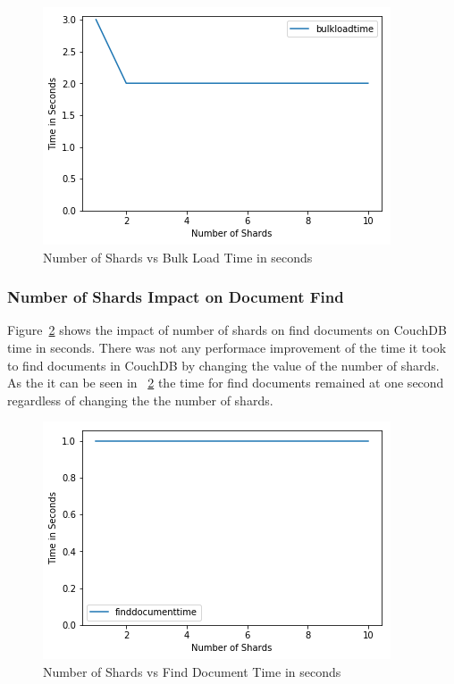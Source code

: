 \begin{figure}[!ht]
  \centering\includegraphics[width=\columnwidth]{../images/ShardsBulkLoad.png}
  \caption{Number of Shards vs Bulk Load Time in seconds }\label{f:shard-bulk}
\end{figure}



\subsubsection{Number of Shards Impact on Document Find}


Figure~\ref{f:shard-find} shows the impact of number of shards on find
documents on CouchDB time in seconds. There was not any performace
improvement of the time it took to find documents in CouchDB  by
changing the value of the number of shards. As the it can be seen in
~\ref{f:shard-find} the time for find documents remained at one second
regardless of changing the the number of shards.

\begin{figure}[!ht]
  \centering\includegraphics[width=\columnwidth]{../images/ShardsFindDoc.png}
  \caption{Number of Shards vs Find Document Time in seconds }\label{f:shard-find}
\end{figure}

